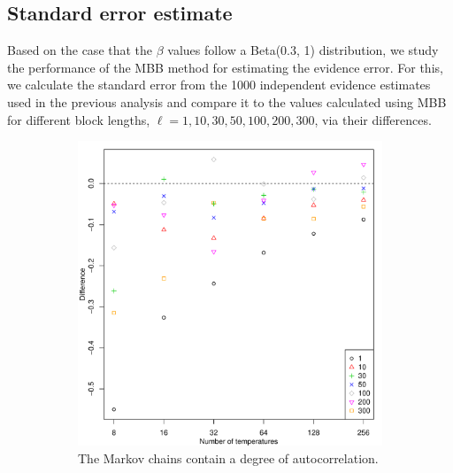\documentclass[aps,reprint,amsmath,amssymb,showpacs,showkeys]{revtex4-1}%
\begin{document}
\subsection{Standard error estimate}
\label{subsec:SDest}

Based on the case that the $\beta$ values follow a Beta(0.3, 1) distribution, we study the performance of the MBB method for estimating the evidence error.  For this, we calculate the standard error from the 1000 independent evidence estimates used in the previous analysis and compare it to the values calculated using MBB for different block lengths, $\ell = 1, 10, 30, 50, 100, 200, 300$, via their differences.  

\begin{figure}[]
	\begin{subfigure}{0.50\textwidth}
	\centering 
	\includegraphics[scale=0.45,clip=true,angle=0]{ErrorEstimates_DepMC.pdf}
	\caption{The Markov chains contain a degree of autocorrelation.}
	\label{fig2a}
	\end{subfigure}
	\begin{subfigure}{0.50\textwidth}
	\centering 

\end{subfigure}
\end{figure}
\end{document}
